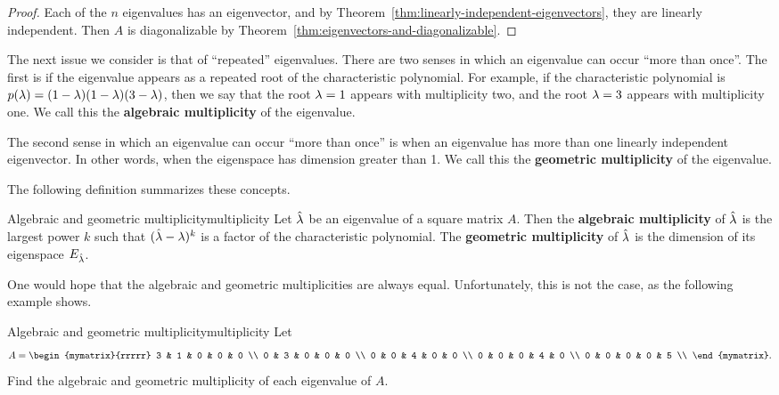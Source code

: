 \begin{proof}
  Each of the $n$ eigenvalues has an eigenvector, and by
  Theorem~\ref{thm:linearly-independent-eigenvectors}, they are
  linearly independent. Then $A$ is diagonalizable by
  Theorem~\ref{thm:eigenvectors-and-diagonalizable}.
\end{proof}

The next issue we consider is that of ``repeated'' eigenvalues. There
are two senses in which an eigenvalue can occur ``more than
once''. The first is if the eigenvalue appears as a repeated root of
the characteristic polynomial. For example, if the characteristic
polynomial is
$p(\lambda) = (1-\lambda)(1-\lambda)(3-\lambda)$, then we say
that the root $\lambda=1$ appears with multiplicity%
 two, and the root
$\lambda=3$ appears with multiplicity one. We call this the
\textbf{algebraic multiplicity}%
%
%
 of the eigenvalue.

The second sense in which an eigenvalue can occur ``more than once''
is when an eigenvalue has more than one linearly independent
eigenvector. In other words, when the eigenspace has dimension greater
than 1. We call this the \textbf{geometric multiplicity}%
%
%
 of the eigenvalue.

The following definition summarizes these concepts.

\begin{definition}{Algebraic and geometric multiplicity}{multiplicity}
  Let $\hat{\lambda}$ be an eigenvalue of a square matrix $A$. Then
  the \textbf{algebraic multiplicity} of $\hat{\lambda}$ is the
  largest power $k$ such that $(\hat{\lambda}-\lambda)^k$ is a
  factor of the characteristic polynomial. The \textbf{geometric
    multiplicity} of $\hat{\lambda}$ is the dimension of its
  eigenspace $E_{\hat{\lambda}}$.
\end{definition}

One would hope that the algebraic and geometric multiplicities are
always equal. Unfortunately, this is not the case, as the following
example shows.

\begin{example}{Algebraic and geometric multiplicity}{multiplicity}
  Let
  \begin{equation*}
    A = \begin{mymatrix}{rrrrr}
      3 & 1 & 0 & 0 & 0 \\
      0 & 3 & 0 & 0 & 0 \\
      0 & 0 & 4 & 0 & 0 \\
      0 & 0 & 0 & 4 & 0 \\
      0 & 0 & 0 & 0 & 5 \\
    \end{mymatrix}.
  \end{equation*}
  Find the algebraic and geometric multiplicity of each eigenvalue
  of $A$.
\end{example}

